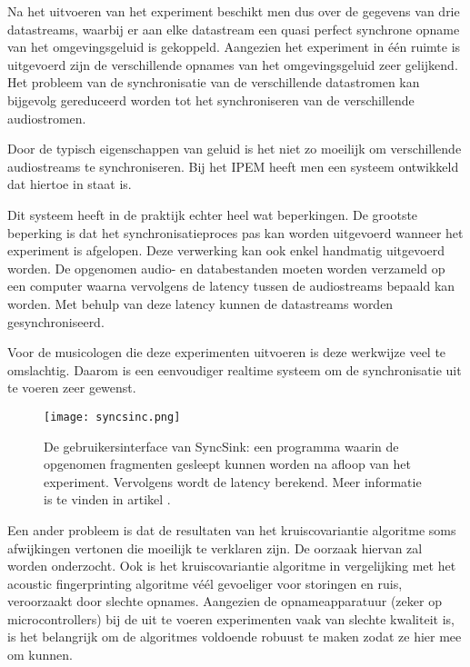 Na het uitvoeren van het experiment beschikt men dus over de gegevens van drie datastreams, waarbij er aan elke datastream een quasi perfect synchrone opname van het omgevingsgeluid is gekoppeld. Aangezien het experiment in één ruimte is uitgevoerd zijn de verschillende opnames van het omgevingsgeluid zeer gelijkend. Het probleem van de synchronisatie van de verschillende datastromen kan bijgevolg gereduceerd worden tot het synchroniseren van de verschillende audiostromen.

Door de typisch eigenschappen van geluid is het niet zo moeilijk om verschillende audiostreams te synchroniseren. Bij het IPEM heeft men een systeem ontwikkeld dat hiertoe in staat is.

Dit systeem heeft in de praktijk echter heel wat beperkingen. De grootste beperking is dat het synchronisatieproces pas kan worden uitgevoerd wanneer het experiment is afgelopen. Deze verwerking kan ook enkel handmatig uitgevoerd worden. De opgenomen audio- en databestanden moeten worden verzameld op een computer waarna vervolgens de latency tussen de audiostreams bepaald kan worden. Met behulp van deze latency kunnen de datastreams worden gesynchroniseerd. 

Voor de musicologen die deze experimenten uitvoeren is deze werkwijze veel te omslachtig. Daarom is een eenvoudiger realtime systeem om de synchronisatie uit te voeren zeer gewenst.

\begin{figure}[!h]
	\captionsetup{width=0.7\textwidth}
	\centering
	\texttt{[image: syncsinc.png]}
	\caption[Gebruikersinterface van SyncSink]{De gebruikersinterface van SyncSink: een programma waarin de opgenomen fragmenten gesleept kunnen worden na afloop van het experiment. Vervolgens wordt de latency berekend. Meer informatie is te vinden in artikel \cite{six2015multimodal}.}
	\label{syncsink-ui}
\end{figure}


Een ander probleem is dat de resultaten van het kruiscovariantie algoritme soms afwijkingen vertonen die moeilijk te verklaren zijn. De oorzaak hiervan zal worden onderzocht. Ook is het kruiscovariantie algoritme in vergelijking met het acoustic fingerprinting algoritme véél gevoeliger voor storingen en ruis, veroorzaakt door slechte opnames. Aangezien de opnameapparatuur (zeker op microcontrollers) bij de uit te voeren experimenten vaak van slechte kwaliteit is, is het belangrijk om de algoritmes voldoende robuust te maken zodat ze hier mee om kunnen.

